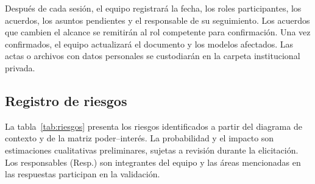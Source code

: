 \documentclass[11pt,a4paper]{article}
\begin{document}
Después de cada sesión, el equipo registrará la fecha, los roles
participantes, los acuerdos, los asuntos pendientes y el responsable
de su seguimiento. Los acuerdos que cambien el alcance se remitirán
al rol competente para confirmación. Una vez confirmados, el equipo
actualizará el documento y los modelos afectados. Las actas o
archivos con datos personales se custodiarán en la carpeta
institucional privada.

\subsection{Registro de riesgos}
La tabla~\ref{tab:riesgos} presenta los riesgos identificados a partir
del diagrama de contexto y de la matriz poder--interés. La probabilidad
y el impacto son estimaciones cualitativas preliminares, sujetas a
revisión durante la elicitación. Los responsables (Resp.) son integrantes del
equipo y las áreas mencionadas en las respuestas participan en la validación.
\end{document}
